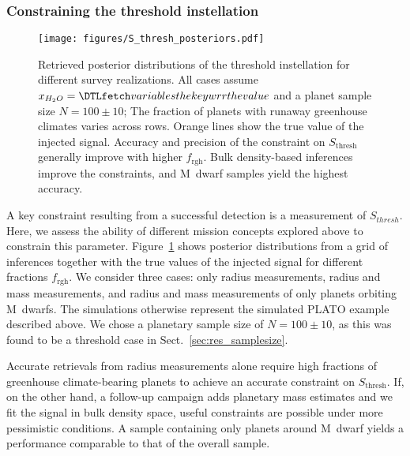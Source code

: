 \documentclass[modern]{aastex631}
\begin{document}
\subsubsection{Constraining the threshold instellation}\label{sec:res_constrain-S_thresh}
\begin{figure}[ht!]
    \begin{centering}
        \texttt{[image: figures/S\_thresh\_posteriors.pdf]}
        \caption{
            Retrieved posterior distributions of the threshold instellation for different survey realizations.
            All cases assume $x_{H_2O} = \var{wrr}$ and a planet sample size $N=100\pm10$; The fraction of planets with runaway greenhouse climates varies across rows.
            Orange lines show the true value of the injected signal.
            Accuracy and precision of the constraint on $S_\mathrm{thresh}$ generally improve with higher $f_\mathrm{rgh}$.
            Bulk density-based inferences improve the constraints, and M~dwarf samples yield the highest accuracy.
        }
        \label{fig:posterior_surveys}
    \end{centering}
\end{figure}
A key constraint resulting from a successful detection is a measurement of $S_{thresh}$.
Here, we assess the ability of different mission concepts explored above to constrain this parameter.
Figure~\ref{fig:posterior_surveys} shows posterior distributions from a grid of inferences together with the true values of the injected signal for different fractions $f_\mathrm{rgh}$.
We consider three cases: only radius measurements, radius and mass measurements, and radius and mass measurements of only planets orbiting M~dwarfs.
The simulations otherwise represent the simulated PLATO example described above.
We chose a planetary sample size of $N=100\pm10$, as this was found to be a threshold case in Sect.~\ref{sec:res_samplesize}.

Accurate retrievals from radius measurements alone require high fractions of greenhouse climate-bearing planets to achieve an accurate constraint on $S_\mathrm{thresh}$.
If, on the other hand, a follow-up campaign adds planetary mass estimates and we fit the signal in bulk density space, useful constraints are possible under more pessimistic conditions.
A sample containing only planets around M~dwarf yields a performance comparable to that of the overall sample.

\end{document}
